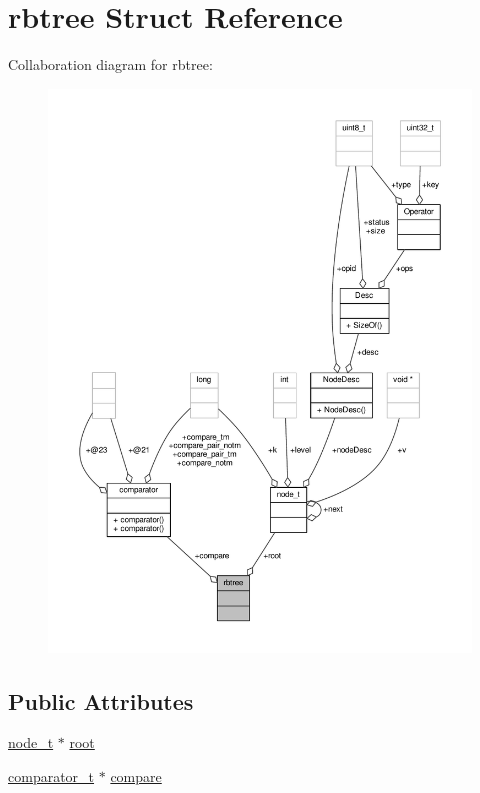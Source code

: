 \hypertarget{structrbtree}{\section{rbtree Struct Reference}
\label{structrbtree}
}


Collaboration diagram for rbtree\-:
\nopagebreak
\begin{figure}[H]
\begin{center}
\leavevmode
\includegraphics[width=350pt]{structrbtree__coll__graph}
\end{center}
\end{figure}
\subsection*{Public Attributes}
\begin{DoxyCompactItemize}
\item 
\hyperlink{structnode__t}{node\-\_\-t} $\ast$ \hyperlink{structrbtree_a5599215e65e20a8fdec3717dc143982d}{root}
\item 
\hyperlink{lehigh_8h_a493abab632f5cea71ed0baaef40590aa}{comparator\-\_\-t} $\ast$ \hyperlink{structrbtree_a2c509d927e5fcd8ea5290b1ae5d5fcf6}{compare}
\end{DoxyCompactItemize}


